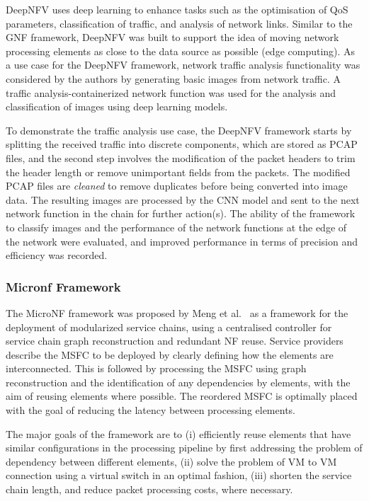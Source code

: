 \documentclass[futureinternet,review,accept,pdftex,moreauthors]{Definitions/mdpi}
\begin{document}
DeepNFV uses deep learning to enhance tasks such as the optimisation of QoS parameters, classification of traffic, and analysis of network links. Similar to the GNF framework, DeepNFV was built to support the idea of moving network processing elements as close to the data source as possible (edge computing). As a use case for the DeepNFV framework, network traffic analysis functionality was considered by the authors by generating basic images from network traffic. A traffic analysis-containerized network function was used for the analysis and classification of images using deep learning models. 

To demonstrate the traffic analysis use case, the DeepNFV framework starts by splitting the received traffic into discrete components, which are stored as PCAP files,  and the second step involves the modification of the packet headers to trim the header length or remove unimportant fields from the packets. The modified PCAP files are \textit{cleaned} to remove duplicates before being converted into image data. The resulting images are processed by the CNN model and sent to the next network function in the chain for further action(s). The ability of the framework to classify images and the performance of the network functions at the edge of the network were evaluated, and improved performance in terms of precision and efficiency was recorded. 


\subsubsection{Micronf Framework}
\label{MicroNF}
The MicroNF framework was proposed by Meng {et al.}~\cite{meng2019micronf} as a framework for the deployment of modularized service chains, using a centralised controller for service chain graph reconstruction and redundant NF reuse. Service providers describe the MSFC to be deployed by clearly defining how the elements are interconnected. This is followed by processing the MSFC using graph reconstruction and the identification of any dependencies by elements, with the aim of reusing elements where possible. The reordered MSFC is optimally placed with the goal of reducing the latency between processing elements.

The major goals of the framework are to (i) efficiently reuse elements that have similar configurations in the processing pipeline by first addressing the problem of dependency between different elements, (ii) solve the problem of VM to VM connection using a virtual switch in an optimal fashion, (iii) shorten the service chain length, and reduce packet processing costs, where necessary.
\end{document}
